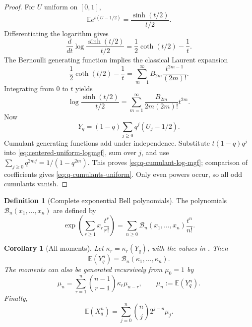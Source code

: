 \documentclass[11pt,oneside,openany]{book}
\newtheorem{corollary}[theorem]{Corollary}
\theoremstyle{definition}
\newtheorem{definition}[theorem]{Definition}
\theoremstyle{remark}
\begin{document}
\begin{proof}
For $U$ uniform on $[0,1]$,
\[
 \mathbb Ee^{t(U-1/2)}
 =\frac{\sinh(t/2)}{t/2}.
\]
Differentiating the logarithm gives
\[
 \frac{d}{dt}\log\frac{\sinh(t/2)}{t/2}
 =\frac12\coth(t/2)-\frac1t.
\]
The Bernoulli generating function implies the classical Laurent expansion
\[
 \frac12\coth(t/2)-\frac1t
 =\sum_{m=1}^{\infty}B_{2m}\frac{t^{2m-1}}{(2m)!}.
\]
Integrating from $0$ to $t$ yields
\begin{equation}\label{eq:centered-uniform-logmgf}
 \log\frac{\sinh(t/2)}{t/2}
 =\sum_{m=1}^{\infty}
   \frac{B_{2m}}{2m(2m)!}t^{2m}.
\end{equation}
Now
\[
 Y_q=(1-q)\sum_{j\ge0}q^j(U_j-1/2).
\]
Cumulant generating functions add under independence.  Substitute
$t(1-q)q^j$ into \eqref{eq:centered-uniform-logmgf}, sum over $j$, and use
$\sum_{j\ge0}q^{2mj}=1/(1-q^{2m})$.  This proves
\eqref{eq:q-cumulant-log-mgf}; comparison of coefficients gives
\eqref{eq:q-cumulants-uniform}.  Only even powers occur, so all odd cumulants vanish.
\end{proof}

\begin{definition}[Complete exponential Bell polynomials]
The polynomials $\mathcal B_n(x_1,\ldots,x_n)$ are defined by
\begin{equation}\label{eq:complete-bell-definition}
 \exp\!\left(\sum_{r\ge1}x_r\frac{t^r}{r!}\right)
 =\sum_{n\ge0}\mathcal B_n(x_1,\ldots,x_n)\frac{t^n}{n!}.
\end{equation}
\end{definition}

\begin{corollary}[All moments]\label{cor:geometric-uniform-moments}
Let $\kappa_r=\kappa_r(Y_q)$, with the values in
.  Then
\begin{equation}\label{eq:centered-moments-bell}
 \mathbb E(Y_q^n)=\mathcal B_n(\kappa_1,\ldots,\kappa_n).
\end{equation}
The moments can also be generated recursively from $\mu_0=1$ by
\begin{equation}\label{eq:moment-cumulant-recurrence}
 \mu_n=\sum_{r=1}^{n}\binom{n-1}{r-1}\kappa_r\mu_{n-r},
 \qquad \mu_n:=\mathbb E(Y_q^n).
\end{equation}
Finally,
\begin{equation}\label{eq:raw-moments-from-centered}
 \mathbb E(X_q^n)=\sum_{j=0}^{n}\binom nj2^{j-n}\mu_j.
\end{equation}
\end{corollary}
\end{document}
